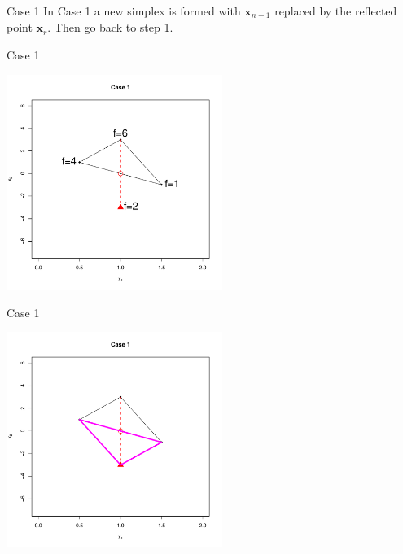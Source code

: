 \documentclass[10pt]{beamer}
\begin{document}
                                                                                              \begin{frame}{Case 1}
                                                                                                In Case 1 a new simplex is formed with ${\bm x_{n+1}}$ replaced by the reflected point ${\bm x_{r}}$.  Then go back to step 1.
                                                                                              \end{frame}
                                                                                              \begin{frame}{Case 1}
                                                                                                \begin{center}
                                                                                                  \includegraphics[height=7cm]{RCode/nmrefl2.pdf}
                                                                                                \end{center}
                                                                                              \end{frame}
                                                                                              \begin{frame}{Case 1}
                                                                                                \begin{center}
                                                                                                  \includegraphics[height=7cm]{RCode/nmrefl3.pdf}
                                                                                                \end{center}
                                                                                              \end{frame}
\end{document}
